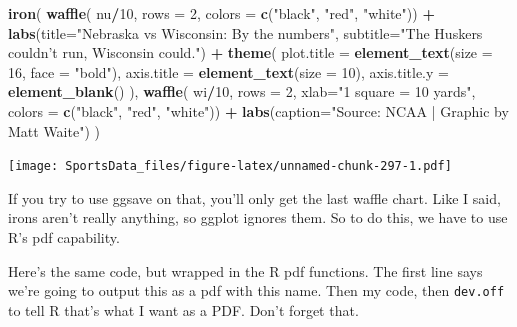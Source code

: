 \documentclass[
]{book}
\newenvironment{Shaded}{\begin{snugshade}}{\end{snugshade}}
\newcommand{\DataTypeTok}[1]{\textcolor[rgb]{0.13,0.29,0.53}{#1}}
\newcommand{\DecValTok}[1]{\textcolor[rgb]{0.00,0.00,0.81}{#1}}
\newcommand{\KeywordTok}[1]{\textcolor[rgb]{0.13,0.29,0.53}{\textbf{#1}}}
\newcommand{\NormalTok}[1]{#1}
\newcommand{\OperatorTok}[1]{\textcolor[rgb]{0.81,0.36,0.00}{\textbf{#1}}}
\newcommand{\StringTok}[1]{\textcolor[rgb]{0.31,0.60,0.02}{#1}}
\begin{document}
\begin{Shaded}
\begin{Highlighting}[]
\KeywordTok{iron}\NormalTok{(}
 \KeywordTok{waffle}\NormalTok{(}
\NormalTok{   nu}\OperatorTok{/}\DecValTok{10}\NormalTok{, }
   \DataTypeTok{rows =} \DecValTok{2}\NormalTok{, }
   \DataTypeTok{colors =} \KeywordTok{c}\NormalTok{(}\StringTok{"black"}\NormalTok{, }\StringTok{"red"}\NormalTok{, }\StringTok{"white"}\NormalTok{)) }\OperatorTok{+}\StringTok{ }
\StringTok{   }\KeywordTok{labs}\NormalTok{(}\DataTypeTok{title=}\StringTok{"Nebraska vs Wisconsin: By the numbers"}\NormalTok{, }\DataTypeTok{subtitle=}\StringTok{"The Huskers couldn't run, Wisconsin could."}\NormalTok{) }\OperatorTok{+}\StringTok{ }
\StringTok{   }\KeywordTok{theme}\NormalTok{(}
    \DataTypeTok{plot.title =} \KeywordTok{element_text}\NormalTok{(}\DataTypeTok{size =} \DecValTok{16}\NormalTok{, }\DataTypeTok{face =} \StringTok{"bold"}\NormalTok{),}
    \DataTypeTok{axis.title =} \KeywordTok{element_text}\NormalTok{(}\DataTypeTok{size =} \DecValTok{10}\NormalTok{),}
    \DataTypeTok{axis.title.y =} \KeywordTok{element_blank}\NormalTok{()}
\NormalTok{  ),}
 \KeywordTok{waffle}\NormalTok{(}
\NormalTok{   wi}\OperatorTok{/}\DecValTok{10}\NormalTok{, }
   \DataTypeTok{rows =} \DecValTok{2}\NormalTok{, }
   \DataTypeTok{xlab=}\StringTok{"1 square = 10 yards"}\NormalTok{, }
   \DataTypeTok{colors =} \KeywordTok{c}\NormalTok{(}\StringTok{"black"}\NormalTok{, }\StringTok{"red"}\NormalTok{, }\StringTok{"white"}\NormalTok{)) }\OperatorTok{+}\StringTok{ }\KeywordTok{labs}\NormalTok{(}\DataTypeTok{caption=}\StringTok{"Source: NCAA | Graphic by Matt Waite"}\NormalTok{)}
\NormalTok{) }
\end{Highlighting}
\end{Shaded}

\texttt{[image: SportsData\_files/figure-latex/unnamed-chunk-297-1.pdf]}

If you try to use ggsave on that, you'll only get the last waffle chart. Like I said, irons aren't really anything, so ggplot ignores them. So to do this, we have to use R's pdf capability.

Here's the same code, but wrapped in the R pdf functions. The first line says we're going to output this as a pdf with this name. Then my code, then \texttt{dev.off} to tell R that's what I want as a PDF. Don't forget that.
\end{document}
